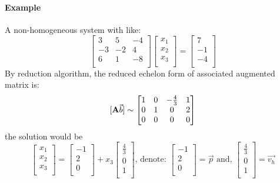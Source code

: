\documentclass{article}
\begin{document}
	\paragraph{Example} A non-homogeneous system with like:
	\[
	\begin{bmatrix}
		3 & 5 & -4 \\
		-3 & -2 & 4 \\
		6 & 1 & -8 \\
	\end{bmatrix}
	\begin{bmatrix}
		x_1 \\
		x_2 \\
		x_3 \\
	\end{bmatrix}
	= 
	\begin{bmatrix}
		7 \\
		-1 \\
		-4 \\
	\end{bmatrix}
	\]
	By reduction algorithm, the reduced echelon form of associated augmented matrix is:
	\[
	[\text{\textbf{A}} \vec{b}] \sim 
	\begin{bmatrix}
		1 & 0 & -\frac{4}{3} & 1\\
		0 & 1 & 0 & 2 \\
		0 & 0 & 0 & 0 \\
	\end{bmatrix}
	\]
	the solution would be 
	\[
	\begin{bmatrix}
		x_1 \\
		x_2 \\
		x_3 \\
	\end{bmatrix}
	= \begin{bmatrix}
		-1 \\
		2 \\
		0 \\
	\end{bmatrix}
	+ x_3 \begin{bmatrix}
		\frac{4}{3} \\
		0 \\
		1 \\
	\end{bmatrix}
	\text{, denote: }
	\begin{bmatrix}
		-1 \\
		2 \\
		0 \\
	\end{bmatrix} = \vec{p}
	\text{ and, }
	\begin{bmatrix}
		\frac{4}{3} \\
		0 \\
		1 \\
	\end{bmatrix} = \vec{v_h}
	\]
\end{document}
